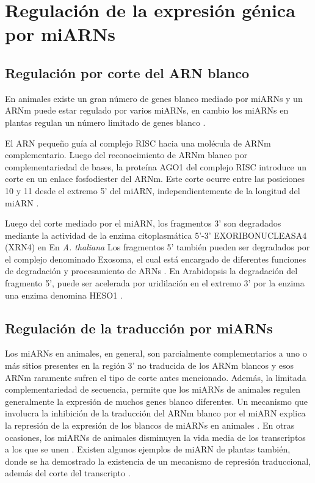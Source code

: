 \section{Regulación de la expresión génica por miARNs}

\subsection{Regulación por corte del ARN blanco}

En animales existe un gran número de genes blanco mediado por miARNs y un ARNm puede estar regulado por varios miARNs, en cambio los miARNs en plantas regulan un número limitado de genes blanco \citep{Voinnet2009669}.

El ARN pequeño guía al complejo RISC hacia una molécula de ARNm complementario. 
Luego del reconocimiento de ARNm blanco por complementariedad de bases, la proteína AGO1 del complejo RISC introduce un corte en un enlace fosfodiester del ARNm.
Este corte ocurre entre las posiciones 10 y 11 desde el extremo 5' del miARN, independientemente de la longitud del miARN \citep{Mallory2004,Llave2002,pmid12931144,Xie2003,pmid15057819}.

Luego del corte mediado por el miARN, los fragmentos 3' son degradados  mediante la actividad de la enzima citoplasmática 5'-3' EXORIBONUCLEASA4 (XRN4) en En \textit{A. thaliana}  \citep{pmid15260969}
Los fragmentos 5' también pueden ser degradados por el complejo denominado Exosoma, el cual está encargado de diferentes funciones de degradación y procesamiento de ARNs \citep{pmid18160042}.
En Arabidopsis la degradación del fragmento 5', puede ser acelerada por uridilación en el extremo 3' por la enzima una enzima denomina HESO1 \citep{pmid24733911}.

\subsection{Regulación de la traducción por miARNs}

Los miARNs en animales, en general, son parcialmente complementarios a uno o más sitios presentes en la región 3' no traducida de los ARNm blancos \citep{pmid12869753,pmid8252621,Fabian} y esos ARNm raramente sufren el tipo de corte antes mencionado. 
Además, la limitada complementariedad de secuencia, permite que los miARNs de animales regulen generalmente la expresión de muchos genes blanco diferentes.
Un mecanismo que involucra la inhibición de la traducción del ARNm blanco por el miARN explica la represión de la expresión de los blancos de miARNs en animales \citep{Fabian}.
En otras ocasiones, los miARNs de animales disminuyen la vida media de los transcriptos a los que se unen \citep{pmid20703300}.
Existen algunos ejemplos de miARN de plantas también, donde se ha demostrado la existencia de un mecanismo de represión traduccional, además del corte del transcripto \citep{Schwab2005517,pmid19531599,pmid18392778,pmid18483398,pmid12893888,pmid14555699}.

